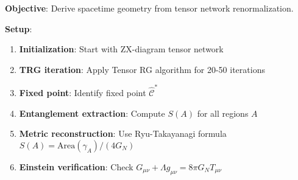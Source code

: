\documentclass[11pt]{article}
\theoremstyle{definition}
\newcommand{\coherence}{\mathcal{C}}
\begin{document}
\textbf{Objective}: Derive spacetime geometry from tensor network renormalization.

\textbf{Setup}:
\begin{enumerate}
\item \textbf{Initialization}: Start with ZX-diagram tensor network
\item \textbf{TRG iteration}: Apply Tensor RG algorithm for 20-50 iterations
\item \textbf{Fixed point}: Identify fixed point $\hat{\coherence}^*$
\item \textbf{Entanglement extraction}: Compute $S(A)$ for all regions $A$
\item \textbf{Metric reconstruction}: Use Ryu-Takayanagi formula $S(A) = \text{Area}(\gamma_A)/(4G_N)$
\item \textbf{Einstein verification}: Check $G_{\mu\nu} + \Lambda g_{\mu\nu} = 8\pi G_N T_{\mu\nu}$
\end{enumerate}
\end{document}

